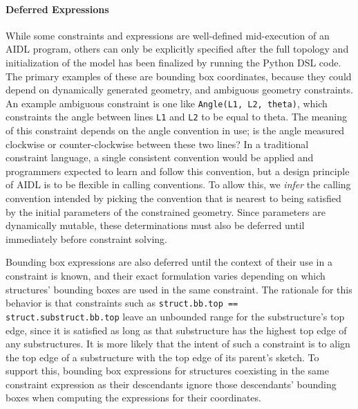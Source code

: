 \paragraph{Deferred Expressions}
While some constraints and expressions are well-defined mid-execution of an AIDL program, others can only be explicitly specified after the full topology and initialization of the model has been finalized by running the Python DSL code. The primary examples of these are bounding box coordinates, because they could depend on dynamically generated geometry, and ambiguous geometry constraints. An example ambiguous constraint is one like \verb|Angle(L1, L2, theta)|, which constraints the angle between lines \verb|L1| and \verb|L2| to be equal to theta. The meaning of this constraint depends on the angle convention in use; is the angle measured clockwise or counter-clockwise between these two lines? In a traditional constraint language, a single consistent convention would be applied and programmers expected to learn and follow this convention, but a design principle of AIDL is to be flexible in calling conventions. To allow this, we \emph{infer} the calling convention intended by picking the convention that is nearest to being satisfied by the initial parameters of the constrained geometry. Since parameters are dynamically mutable, these determinations must also be deferred until immediately before constraint solving.

Bounding box expressions are also deferred until the context of their use in a constraint is known, and their exact formulation varies depending on which structures' bounding boxes are used in the same constraint. The rationale for this behavior is that constraints such as \verb|struct.bb.top == struct.substruct.bb.top| leave an unbounded range for the substructure's top edge, since it is satisfied as long as that substructure has the highest top edge of any substructures. It is more likely that the intent of such a constraint is to align the top edge of a substructure with the top edge of its parent's sketch. To support this, bounding box expressions for structures coexisting in the same constraint expression as their descendants ignore those descendants' bounding boxes when computing the expressions for their coordinates.

